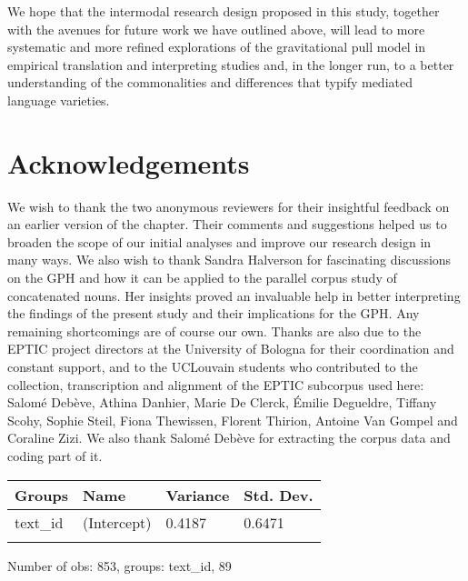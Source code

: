 \documentclass[output=paper]{langscibook}
\begin{document}
We hope that the intermodal research design proposed in this study, together with the avenues for future work we have outlined above, will lead to more systematic and more refined explorations of the gravitational pull model in empirical translation and interpreting studies and, in the longer run, to a better understanding of the commonalities and differences that typify mediated language varieties. 


\section*{Acknowledgements}

We wish to thank the two anonymous reviewers for their insightful feedback on an earlier version of the chapter. Their comments and suggestions helped us to broaden the scope of our initial analyses and improve our research design in many ways. We also wish to thank Sandra Halverson for fascinating discussions on the GPH and how it can be applied to the parallel corpus study of concatenated nouns. Her insights proved an invaluable help in better interpreting the findings of the present study and their implications for the GPH. Any remaining shortcomings are of course our own. Thanks are also due to the EPTIC project directors at the University of Bologna for their coordination and constant support, and to the UCLouvain students who contributed to the collection, transcription and alignment of the EPTIC subcorpus used here: Salomé Debève, Athina Danhier, Marie De Clerck, Émilie Degueldre, Tiffany Scohy, Sophie Steil, Fiona Thewissen, Florent Thirion, Antoine Van Gompel and Coraline Zizi. We also thank Salomé Debève for extracting the corpus data and coding part of it.  


\label{ap:lefer:1}




\begin{tabularx}{\textwidth}{XXXX}

\lsptoprule
Groups & Name & Variance & Std. Dev.\\
\midrule
text\_id & (Intercept) & 0.4187 & 0.6471  \\
\lspbottomrule
\end{tabularx}
\noindent
Number of obs: 853, groups:  text\_id, 89


\end{document}
